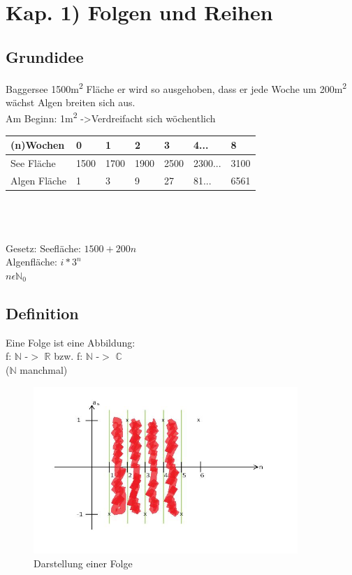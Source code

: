 \documentclass[../mainfile.tex]{subfile}
\author{Barbara Wiedermann}
\begin{document}
	\section{Kap. 1) Folgen und Reihen}
	\subsection{Grundidee}
	 	Baggersee 1500m\textsuperscript{2} Fläche er wird so ausgehoben, dass er jede Woche um 200m\textsuperscript{2} wächst Algen breiten sich aus.\\
	 	Am Beginn: 1m\textsuperscript{2} -\textgreater Verdreifacht sich wöchentlich\\
	 	
\begin{tabular}{|l|l|l|l|l|l|l|}
\hline
(n)Wochen    & 0    & 1    & 2    & 3    & 4...    & 8    \\ \hline
See Fläche   & 1500 & 1700 & 1900 & 2500 & 2300... & 3100 \\ \hline
Algen Fläche & 1    & 3    & 9    & 27   & 81...   & 6561 \\ \hline
\end{tabular}\\\\\\
Gesetz: Seefläche: $1500+200n$\\
Algenfläche: $i*3^n$\\
$n \epsilon \mathbb{N}_0$ \\

\subsection{Definition}
Eine Folge ist eine Abbildung: \\
f: $\mathbb{N}$ -$>$ $\mathbb{R}$ bzw. f: $\mathbb{N}$ -$>$ $\mathbb{C}$\\
($\mathbb{N}$ manchmal)\\

\begin{figure}[!htbp]
\centering
\includegraphics[width=10cm]{./bwiedermann/img/Zeichnung.jpg}
\caption{Darstellung einer Folge}
\end{figure}
\end{document}
